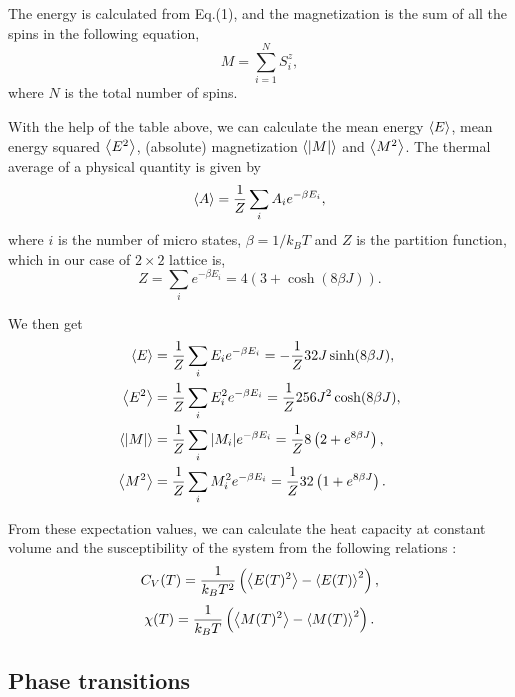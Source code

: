 \documentclass{article}
\begin{document}
The energy is calculated from Eq.(1), and the magnetization is the sum of all the spins in the following equation,
\begin{equation}
M = \sum_{i = 1}^{N} S^z_i,
\end{equation}
where $N$ is the total number of spins.

With the help of the table above, we can calculate the mean energy $\ev{E}$, mean energy squared $\ev{E^2}$, (absolute) magnetization $\ev{\abs{M}}$ and  $\ev{M^2}$. The thermal average of a physical quantity is given by
\begin{equation}
\ev{A} = \frac{1}{Z} \sum_i A_i e^{-\beta E_i},
\end{equation}
where $i$ is the number of micro states, $\beta = 1/k_B T$ and $Z$ is the partition function, which in our case of $2 \times 2$ lattice is,
\begin{equation}
Z = \sum_i e^{-\beta E_i} = 4\left(3 + \cosh (8\beta J)\right).
\end{equation}

We then get
\begin{align}\label{eq:expvals}
\ev{E} &= \frac{1}{Z} \sum_i E_i e^{-\beta E_i} = -\frac{1}{Z}32J\sinh (8\beta J),\\
\ev{E^2} &= \frac{1}{Z} \sum_i E_i^2 e^{-\beta E_i} = \frac{1}{Z}256J^2\cosh (8\beta J),\\
\ev{\abs{M}} &= \frac{1}{Z} \sum_i \abs{M_i} e^{-\beta E_i} = \frac{1}{Z}8\left(2 + e^{8\beta J}\right),\\
\ev{M^2} &= \frac{1}{Z} \sum_i M_i^2 e^{-\beta E_i} = \frac{1}{Z}32\left( 1 + e^{8\beta J}\right).
\end{align}

From these expectation values, we can calculate the heat capacity at constant volume and the susceptibility of the system from the following relations  \cite{hjorten}:
\begin{equation}\label{eq:heatcap}
C_V(T) = \frac{1}{k_BT^2}\left(\ev{E(T)^2} - \ev{E(T)}^2\right),
\end{equation}
\begin{equation}\label{eq:suscept}
\chi(T) = \frac{1}{k_B T}\left(\ev{M(T)^2} - \ev{M(T)}^2\right).
\end{equation}

\subsection{Phase transitions }\label{const_mot}
\end{document}
